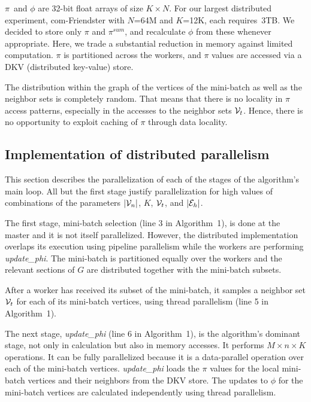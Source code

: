 $\pi$~and $\phi$ are 32-bit float arrays of size $K \times N$. For our
largest distributed experiment, com-Friendster with $N$=64M and $K$=12K, each
requires~3TB. We decided to store only $\pi$ and $\pi^{sum}$, and recalculate
$\phi$ from these whenever appropriate. Here, we trade a substantial reduction
in memory against limited computation. $\pi$ is partitioned across the workers,
and $\pi$ values are accessed via a DKV (distributed key-value) store.


The distribution within the graph of the vertices of the mini-batch as well as
the neighbor sets is completely random. That means that there is no locality
in $\pi$ access patterns, especially in the accesses to the neighbor sets
$\cV_t$.
Hence, there is no opportunity to exploit caching of $\pi$ through data
locality.


\subsection{Implementation of distributed parallelism}

This section describes the parallelization of each of the stages of the
algorithm's main loop. All but the first stage justify parallelization for
high values of combinations of the  parameters $|\cV_n|$, $K$, $\cV_t$, and $|\cE_h|$.

The first stage, mini-batch selection (line 3 in Algorithm~1), is done at the master and it is
not itself parallelized. However, the distributed implementation overlaps
its execution using pipeline parallelism while the workers are
performing \textit{update\_phi}. The mini-batch is partitioned equally over
the workers and the relevant sections of $G$ are distributed together with the
mini-batch subsets.

After a worker has received its subset of the mini-batch, it samples a neighbor
set $\cV_t$ for each of its mini-batch vertices, using thread parallelism
(line 5 in Algorithm~1).

The next stage, \textit{update\_phi} (line 6 in Algorithm~1), is the algorithm's dominant stage, not
only in calculation but also in memory accesses. It performs $M\times n\times
K$ operations. It can be fully parallelized because it is a data-parallel
operation over each of the mini-batch vertices. \textit{update\_phi} loads the
$\pi$ values for the local mini-batch vertices and their neighbors from the
DKV store. The updates to $\phi$ for the mini-batch vertices are calculated
independently using thread parallelism.

